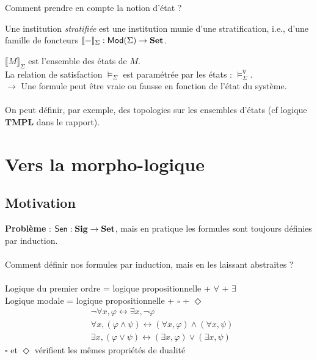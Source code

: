 \documentclass{beamer}
\newcommand{\gr}{\textbf}
\newcommand{\info}[1]{\text{{\fontfamily{lmss}\selectfont #1}}}
\newcommand{\Mod}{\info{Mod}}
\newcommand{\Sen}{\info{Sen}}
\begin{document}
\begin{frame}
Comment prendre en compte la notion d'état ? \pause
\begin{definition}[Stratification]
Une institution \textit{stratifiée} est une institution munie d'une stratification, i.e., d'une famille de foncteurs $\llbracket - \rrbracket_\Sigma : \Mod(\Sigma) \to \gr{Set}$.
\end{definition}
$\llbracket M \rrbracket_\Sigma$ est l'ensemble des états de $M$. \\
\pause
La relation de satisfaction $\models_\Sigma$ est paramétrée par les états : $\models_\Sigma^\eta$.\\
$\longrightarrow$ Une formule peut être vraie ou fausse en fonction de l'état du système. \\~\\
On peut définir, par exemple, des topologies sur les ensembles d'états (cf logique $\textbf{TMPL}$ dans le rapport).
\end{frame}

\section{Vers la morpho-logique}

\subsection{Motivation}
\begin{frame}
\gr{Problème} : $\Sen : \gr{Sig} \to \gr{Set}$, mais en pratique les formules sont toujours définies par induction.\\~\\ \pause
Comment définir nos formules par induction, mais en les laissant abstraites ? \pause \\~\\
Logique du premier ordre = logique propositionnelle + $\forall$ + $\exists$\\
Logique modale = logique propositionnelle + $\square$ + $\Diamond$\\ \pause
\begin{align*}
& \neg \forall x, \varphi \leftrightarrow \exists x, \neg \varphi \\
& \forall x, (\varphi \wedge \psi) \leftrightarrow (\forall x, \varphi) \wedge (\forall x, \psi) \\
& \exists x, (\varphi \vee \psi) \leftrightarrow (\exists x, \varphi) \vee (\exists x, \psi)
\end{align*} \pause
$\square$ et $\Diamond$ vérifient les mêmes propriétés de dualité
\end{frame}
\end{document}
